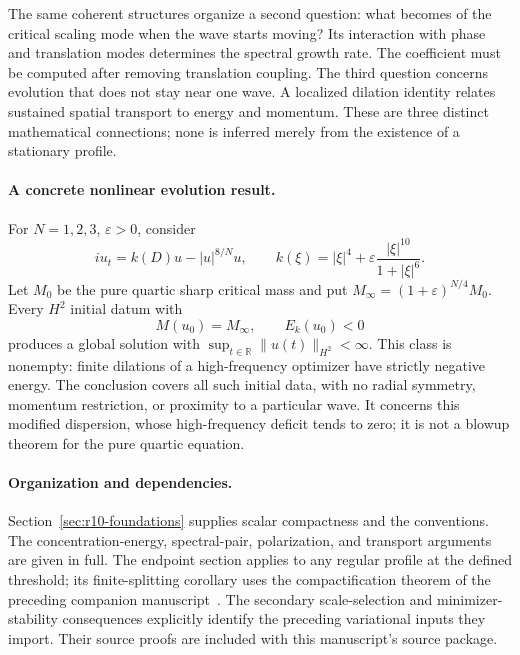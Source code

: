 \documentclass[11pt,a4paper]{article}
\theoremstyle{remark}\newtheorem{remark}[theorem]{Remark}
\begin{document}
The same coherent structures organize a second question: what becomes
of the critical scaling mode when the wave starts moving? Its interaction
with phase and translation modes determines the spectral growth rate.
The coefficient must be computed after removing translation coupling.
The third question concerns evolution that does not stay near one wave.
A localized dilation identity relates sustained spatial transport to
energy and momentum. These are three distinct mathematical connections;
none is inferred merely from the existence of a stationary profile.

\paragraph{A concrete nonlinear evolution result.}
For $N=1,2,3$, $\varepsilon>0$, consider
\[
 iu_t=k(D)u-|u|^{8/N}u,\qquad
 k(\xi)=|\xi|^4+\varepsilon\frac{|\xi|^{10}}{1+|\xi|^6}.
\]
Let $M_0$ be the pure quartic sharp critical mass and put
$M_\infty=(1+\varepsilon)^{N/4}M_0$.
Every $H^2$ initial datum with
\[
 M(u_0)=M_\infty,\qquad E_k(u_0)<0
\]
produces a global solution with $\sup_{t\in\mathbb R}\|u(t)\|_{H^2}<\infty$.
This class is nonempty: finite dilations of a high-frequency optimizer
have strictly negative energy. The conclusion covers all such initial
data, with no radial symmetry, momentum restriction, or proximity to a
particular wave. It concerns this modified dispersion, whose high-frequency
deficit tends to zero; it is not a blowup theorem for the pure quartic
equation.

\paragraph{Organization and dependencies.}
Section~\ref{sec:r10-foundations} supplies scalar compactness and the
conventions. The concentration-energy, spectral-pair, polarization, and
transport arguments are given in full. The endpoint section applies to
any regular profile at the defined threshold; its finite-splitting
corollary uses the compactification theorem of the preceding companion
manuscript~\cite{companion}. The secondary scale-selection and
minimizer-stability consequences explicitly identify the preceding
variational inputs they import. Their source proofs are included with
this manuscript's source package.







\end{document}
